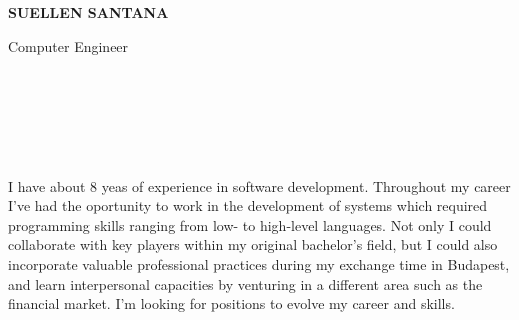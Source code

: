 \documentclass[10pt]{developercv} %
\begin{document}
\begin{minipage}[t]{0.6\textwidth}
  \vspace{-\baselineskip} %

  {\HUGE\textbf{\MakeUppercase{Suellen Santana}}}
  \vspace{5pt}

  {\huge Computer Engineer} %

  \\

\end{minipage}
\begin{minipage}[t]{0.3\textwidth}
  \vspace{-\baselineskip} %

  \\
  \\
  \\
\end{minipage}



\begin{minipage}[t]{\textwidth}

  I have about 8 yeas of experience in software development. Throughout my career I’ve had the oportunity to work in the development of systems which required programming skills ranging from low- to high-level languages. Not only I could collaborate with key players within my original bachelor’s field, but I could also incorporate valuable professional practices during my exchange time in Budapest, and learn interpersonal capacities by venturing in a different area such as the financial market. I’m looking for positions to evolve my career and skills.
\end{minipage}


\begin{minipage}[t]{\textwidth}

  \begin{skills}
  \end{skills}
\end{minipage}
\end{document}
